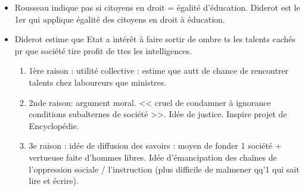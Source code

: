 \documentclass[12pt]{report}
\begin{document}
\begin{itemize}
\item Rousseau indique pas si citoyens en droit = égalité d'éducation. Diderot est le 1er qui applique égalité des citoyens en droit à éducation. \\


\vspace{0.5cm}

\item Diderot estime que Etat a intérêt à faire sortir de ombre ts les talents cachés pr que société tire profit de ttes les intelligences.
\begin{enumerate}
\item 1ère raison : utilité collective : estime que autt de chance de rencontrer talents chez laboureurs que ministres. \\
\item 2nde raison: argument moral. << cruel de condamner à ignorance conditions subalternes de société >>. Idée de justice. Inspire projet de Encyclopédie.\\
\item 3e raison : idée de diffusion des savoirs : moyen de fonder 1 société + vertueuse faite d'hommes libres. Idée d'émancipation des chaînes de l'oppression sociale / l'instruction (plus difficile de malmener qq'1 qui sait lire et écrire). \\


\end{enumerate}
\end{itemize}
\end{document}
